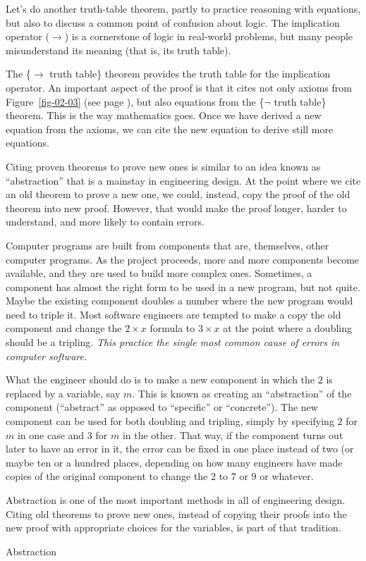 Let's do another truth-table theorem, partly to practice
reasoning with equations, but also to discuss a common
point of confusion about logic. The implication operator
($\rightarrow$) is a cornerstone of logic in real-world problems,
but many people misunderstand its meaning (that is, its truth table).

The \{$\rightarrow$ truth table\} theorem provides the truth table for the implication operator. An important aspect of the proof is that it cites not only axioms from Figure~\ref{fig-02-03} (see page \pageref{fig-02-03}),
but also equations from the \{$\neg$ truth table\} theorem. This is the way mathematics goes. Once we have derived a new equation from the axioms, we can cite the new equation to derive still more equations.

\begin{aside}
Citing proven theorems to prove new ones is similar to an idea known as ``abstraction''
that is a mainstay in engineering design.
At the point where we cite an old theorem to prove a new one,
we could, instead, copy the proof of the old theorem into new proof.
However, that would make the proof longer, harder to understand,
and more likely to contain errors.

Computer programs are built from components that are, themselves, other computer programs. As the project proceeds, more and more components become available, and they are used to build more complex ones. Sometimes, a component has almost the right form to be used in a new program, but not quite. Maybe the existing component doubles a number where the new program would need to triple it. Most software engineers are tempted to make a copy the old component and change the $2 \times x$ formula to $3 \times x$ at the point where a doubling should be a tripling. \emph{This practice the single most common cause of errors in computer software.}

What the engineer should do is to make a new component in which the $2$ is replaced by a variable, say $m$. This is known as creating an ``abstraction'' of the component (``abstract'' as opposed to ``specific'' or ``concrete''). The new component can be used for both doubling and tripling, simply by specifying $2$ for $m$ in one case and $3$ for $m$ in the other. That way, if the component turns out later to have an error in it, the error can be fixed in one place instead of two (or maybe ten or a hundred places, depending on how many engineers have made copies of the original component to change the $2$ to $7$ or $9$ or whatever.

Abstraction is one of the most important methods in all of engineering design. Citing old theorems to prove new ones, instead of copying their proofs into the new proof with appropriate choices for the variables, is part of that tradition.
\caption{Abstraction}
\label{abstraction}
\end{aside}

